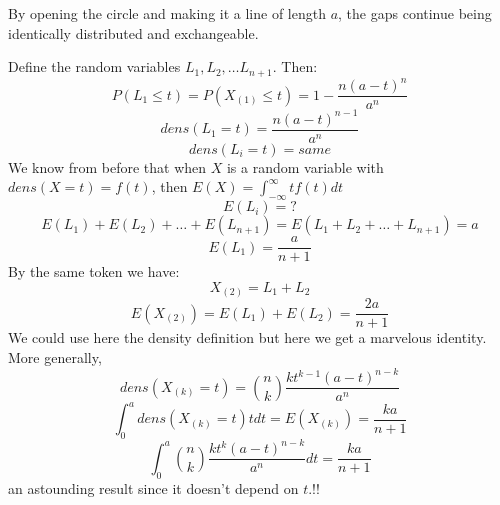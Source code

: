 By opening the circle and making it a line of length $a$, the gaps continue being identically distributed and exchangeable.

Define the random variables $L_1, L_2, \ldots L_{n+1}$.  Then:
\begin{displaymath}
P(L_1 \leq t) = P(X_{(1)} \leq t) =  1- \frac {n(a-t)^n} {a^n}
\end{displaymath}
\begin{displaymath}
dens(L_1 =t ) = \frac {n(a-t)^{n-1}} {a^n}
\end{displaymath}
\begin{displaymath}
dens(L_i = t) = same
\end{displaymath}
We know from before that when $X$ is a random variable with $dens(X=t) =f(t)$, then $E(X) = \int_{-\infty}^{\infty} tf(t)dt$
\begin{displaymath}
E(L_i) = ? \end{displaymath}
\begin{displaymath}
E(L_1) + E(L_2) + \ldots + E(L_{n+1}) = E(L_1 + L_2 + \ldots + L_{n+1}) = a\end{displaymath}
\begin{displaymath}
E(L_1) = \frac {a} {n+1}
\end{displaymath}
By the same token we have:
\begin{displaymath}
X_{(2)} = L_1 + L_2
\end{displaymath}
\begin{displaymath}
E(X_{(2)}) = E(L_1) + E(L_2) = \frac {2a} {n+1}
\end{displaymath}
We could use here the density definition but here we get a marvelous identity.
More generally,
\begin{displaymath}
dens(X_{(k)} = t) = {n\choose k}\frac {kt^{k-1}(a-t)^{n-k}} {a^n}
\end{displaymath}
\begin{displaymath}
\int_{0}^{a} dens(X_{(k)} = t)t dt = E(X_{(k)}) = \frac {ka} {n+1}
\end{displaymath}
\begin{displaymath}
\int_{0}^{a} {n\choose k}\frac {kt^k(a-t)^{n-k}} {a^n} dt = \frac {ka} {n+1}
\end{displaymath}
an astounding result since it doesn't depend on $t$.!!

